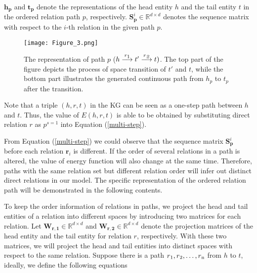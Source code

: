\documentclass[11pt,a4paper]{article}
\begin{document}
$\mathbf{h_{p}}$ and $\mathbf{t_{p}}$ denote the representations of
the head entity $h$ and the tail entity $t$ in the ordered relation
path $p$, respectively.
$\mathbf{S}^{i}_{\mathbf{p}}\mathbf{\in}\mathbb{R}^{{d \times}{d}}$ denotes
the sequence matrix with respect to the $i$-th relation in the given
path $p$.

\begin{figure*}[]
    \centering
    \texttt{[image: Figure\_3.png]}
    \caption{The representation of path $p$ (${h}\stackrel{
{r\textsubscript{1}}}{\longrightarrow}{t'}\stackrel{
{r\textsubscript{\emph{2}}}}{\longrightarrow}{t})$. The top part of the figure depicts the process of space transition of $t'$ and $t$, while the bottom part illustrates the generated continuous path from $h_{p}$ to $t_{p}$  after the transition.} 
\label{path}
\end{figure*}

Note that a triple $(h,r,t)$ in the KG can be seen as a one-step
path between $h$ and $t$. Thus, the value of $E(h,r,t)$ is able to
be obtained by substituting direct relation $r$ as $p^{s=1}$ into
Equation (\ref{multi-step}).

From Equation (\ref{multi-step}) we could observe that the sequence
matrix $\mathbf{S}^{i}_{\mathbf{p}}$ before each relation
$\textbf{r}_{i}$ is different. If the order of several relations in
a path is altered, the value of energy function will also change at
the same time. Therefore, paths with the same relation set but
different relation order will infer out distinct direct relations in
our model. The specific representation of the ordered relation path
will be demonstrated in the following contents.

To keep the order information of relations in paths, we project the
head and tail entities of a relation into different spaces by
introducing two matrices for each relation. Let
\(\mathbf{W}_{\mathbf{r,1}}\mathbf{\in}\mathbb{R}^{{d \times}{d}}\)
and \(\mathbf{W}_{\mathbf{r,2}}\mathbf{\in}\mathbb{R}^{{d
\times}{d}}\) denote the projection matrices of the head entity and
the tail entity for relation ${r}$, respectively. With these two
matrices, we will project the head and tail entities into distinct
spaces with respect to the same relation. Suppose there is a
path ${r\textsubscript{1}}, {r\textsubscript{2}}, \ldots{},
{r\textsubscript{n}}$ from ${h}$ to ${t}$, ideally, we define the
following equations
\end{document}
